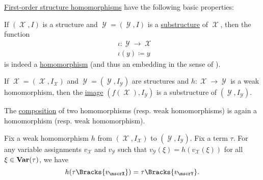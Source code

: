 \begin{proposition}\label{thm:first_order_homomorphism_properties}
  \hyperref[def:first_order_homomorphism]{First-order structure homomorphisms} have the following basic properties:
  \begin{thmenum}
     If \( (\mscrX, I) \) is a structure and \( \mscrY = (\mscrY, I) \) is a \hyperref[def:first_order_substructure]{substructure} of \( \mscrX \), then the  function
    \begin{equation}\label{thm:first_order_homomorphism_properties/substructure/canonical_embedding}
      \begin{aligned}
        &\iota: \mscrY \to \mscrX \\
        &\iota(y) \coloneqq y
      \end{aligned}
    \end{equation}
    is indeed a \hyperref[def:first_order_homomorphism_invertibility/projection]{homomorphism} (and thus an embedding in the sense of ).

     If \( \mscrX = (\mscrX, I_\mscrX) \) and \( \mscrY = (\mscrY, I_\mscrY) \) are structures and \( h: \mscrX \to \mscrY \) is a weak homomorphism, then the \hyperref[def:function/image]{image} \( (f(\mscrX), I_\mscrY) \) is a substructure of \( (\mscrY, I_\mscrY) \).

     The \hyperref[def:function/composition]{composition} of two homomorphisms (resp. weak homomorphisms) is again a homomorphism (resp. weak homomorphism).

     Fix a weak homomorphism \( h \) from \( (\mscrX, I_\mscrX) \) to \( (\mscrY, I_\mscrY) \). Fix a term \( \tau \). For any variable assignments \( v_\mscrX \) and \( v_\mscrY \) such that \( v_\mscrY(\xi) = h(v_\mscrX(\xi)) \) for all \( \xi \in \operatorname{\mathbf{Var}}(\tau) \), we have
    \begin{equation*}
      h(\tau\Bracks{v_\mscrX}) = \tau\Bracks{v_\mscrY}.
    \end{equation*}
  \end{thmenum}
\end{proposition}
